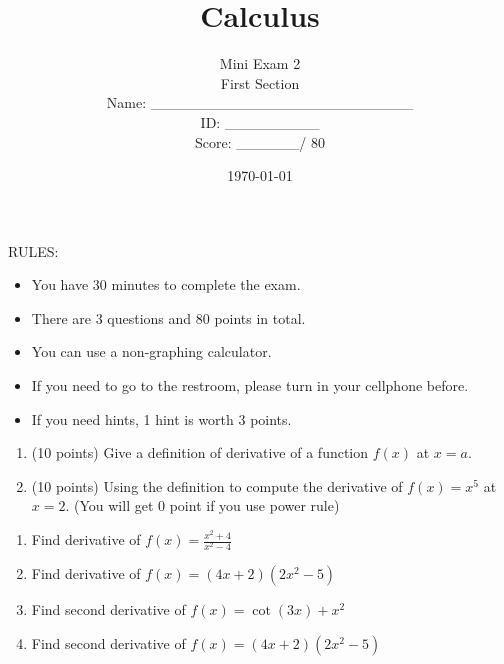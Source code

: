 \documentclass[12pt]{amsart}
\title{ Calculus }
\author{  Mini Exam 2 \\ First Section \\ \vspace{1cm} Name: \_\_\_\_\_\_\_\_\_\_\_\_\_\_\_\_\_\_\_\_\_\_\_\_\_  
\\ \vspace{1cm} ID: \_\_\_\_\_\_\_\_\_ \\ \vspace{1cm} Score: \_\_\_\_\_\_/ 80}
\date{\today}
\begin{document}
\maketitle


RULES:
\begin{itemize}
	\item You have 30 minutes to complete the exam.
	\item There are 3 questions and 80 points in total.
	\item You can use a non-graphing calculator.
	\item If you need to go to the restroom, please turn in your cellphone before.
	\item If you need hints, 1 hint is worth 3 points.
\end{itemize}

\newpage

\begin{problem}[20 points]
\begin{enumerate}
	\item (10 points) Give a definition of derivative of a function $f(x)$ at $x = a$.
	      \vspace{9cm}
	\item (10 points) Using the definition to compute the derivative of $f(x) = x^5$ at $x = 2$.
	      (You will get 0 point if you use power rule)
	      \vspace{9cm}
\end{enumerate}
\end{problem}

\newpage

\begin{problem}[20 points]
\begin{enumerate}
	\item Find derivative of $\displaystyle f(x) = \frac{x^2 + 4}{x^2 - 4}$
	      \vspace{10cm}
	\item Find derivative of $\displaystyle f(x) = (4x+ 2)(2x^2 - 5)$
	      \vspace{10cm}
	\item Find second derivative of $\displaystyle f(x) = \cot (3x) + x^2$
	      \vspace{10cm}
	\item Find second derivative of $\displaystyle f(x) = (4x+ 2)(2x^2 - 5)$
	      \vspace{10cm}
\end{enumerate}
\end{problem}
\end{document}
